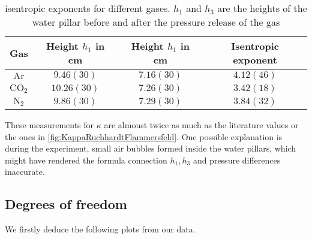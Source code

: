 \documentclass[../main.tex]{subfiles}
\begin{document}
            \begin{table}[H]
                \centering
                \begin{tabular}{c|cc|c}
                    \textbf{Gas} & \textbf{Height $h_1$ in cm} & \textbf{Height $h_1$ in cm} & \textbf{Isentropic exponent}\\
                    \hline
                    $\text{Ar}$ & $9.46(30)$ & $7.16(30)$ & $4.12(46)$\\
                    $\text{CO}_2$ & $10.26(30)$ & $7.26(30)$ & $3.42(18)$\\
                    $\text{N}_2$ & $9.86(30)$ & $7.29(30)$ & $3.84(32)$\\
                \end{tabular}
                \caption{isentropic exponents for different gases. $h_1$ and $h_3$ are the heights of the water pillar before and after the pressure release of the gas}
            \end{table}
            
            These measurements for $\kappa$ are almoust twice as much as the literature values or the ones in \ref{fig:KappaRuchhardtFlammersfeld}. One possible explanation is during the experiment, small air bubbles formed inside the water pillars, which might have rendered the formula connection $h_1,h_3$ and pressure differences inaccurate.

    \subsection{Degrees of freedom}
        We firstly deduce the following plots from our data. 
\end{document}

